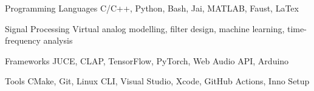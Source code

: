 

\begin{cvskills}

    \cvskill
    {Programming Languages} %
    {C/C++, Python, Bash, Jai, MATLAB, Faust, LaTex} %

    \cvskill
    {Signal Processing} %
    {Virtual analog modelling, filter design, machine learning, time-frequency analysis} %

    \cvskill
    {Frameworks} %
    {JUCE, CLAP, TensorFlow, PyTorch, Web Audio API, Arduino} %

    \cvskill
    {Tools} %
    {CMake, Git, Linux CLI, Visual Studio, Xcode, GitHub Actions, Inno Setup} %

\end{cvskills}
